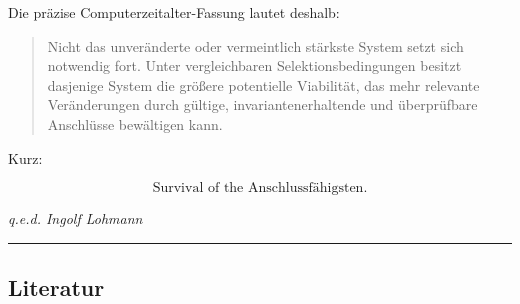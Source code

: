 \documentclass[
  10pt,
  a4paper,
]{article}
\begin{document}
Die präzise Computerzeitalter-Fassung lautet deshalb:

\begin{quote}
Nicht das unveränderte oder vermeintlich stärkste System setzt sich
notwendig fort. Unter vergleichbaren Selektionsbedingungen besitzt
dasjenige System die größere potentielle Viabilität, das mehr relevante
Veränderungen durch gültige, invariantenerhaltende und überprüfbare
Anschlüsse bewältigen kann.
\end{quote}

Kurz:

\[
\boxed{\text{Survival of the Anschlussfähigsten}.}
\]

\emph{q.e.d. Ingolf Lohmann}

\begin{center}\rule{0.5\linewidth}{0.5pt}\end{center}

\hypertarget{literatur}{%
\subsection{Literatur}\label{literatur}}
\end{document}
